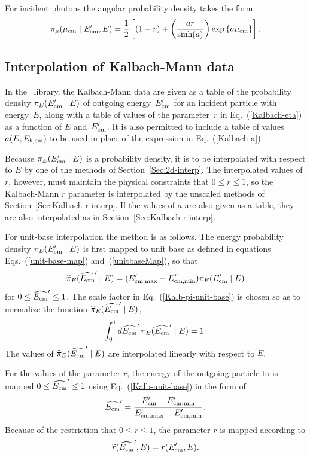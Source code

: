 {For incident photons the angular probability density takes the form
$$
  \pi_\mu( \mu_{\text{cm}} \mid E_{\text{cm}}', E ) =
  \frac{1}{2} \left[
    (1 - r) + \left(
      \frac{ar}{\sinh(a)}
    \right) \exp\left\{a \mu_{\text{cm}}\right\}
  \right].
$$


\subsection{Interpolation of Kalbach-Mann data}\label{Sec:Kalbach-Mann-interp}

In the \xendl\ library, the Kalbach-Mann data are given
as a table of the probability density $\pi_E( E_{\text{cm}}' \mid E)$ of outgoing
energy~$E_{\text{cm}}'$ for an incident particle with energy~$E$,
along with a table of values of the parameter~$r$ in Eq.~(\ref{Kalbach-eta})
as a function of $E$ and~$E_{\text{cm}}'$.  It is also permitted to include a
table of values $a(E,  E_{b,\text{cm}})$ to be used in place of the expression
in Eq.~(\ref{Kalbach-a}).
}%

Because $\pi_E( E_{\text{cm}}' \mid E)$ is a probability
density, it is to be interpolated with respect to $E$ by one of the methods
of Section~\ref{Sec:2d-interp}.  
The interpolated values of $r$, however, must 
maintain the physical constraints that $0 \le r \le 1$,
so the Kalbach-Mann $r$ parameter is interpolated by the unscaled methods of
Section~\ref{Sec:Kalbach-r-interp}.  If the values of $a$ are also
given as a table, they are also interpolated as in Section~\ref{Sec:Kalbach-r-interp}.

For unit-base interpolation the method is as follows.
The energy probability density
$\pi_E( E_{\text{cm}}' \mid E)$ is first mapped to unit base as defined in equations
Eqs.~(\ref{unit-base-map}) and~(\ref{unitbaseMap}), so that
\begin{equation}
  \widehat \pi_E( \widehat {E_{\text{cm}}}' \mid E) =
    ( E'_{\text{cm}, \text{max}} - E'_{\text{cm}, \text{min}} ) 
     \pi_E( E_{\text{cm}}' \mid E)
 \label{Kalb-pi-unit-base}
\end{equation}
for $0 \le \widehat {E_{\text{cm}}}' \le 1$.
The scale factor in Eq.~(\ref{Kalb-pi-unit-base}) is chosen so as to 
normalize the function $\widehat \pi_E( \widehat {E_{\text{cm}}}' \mid E) $,
$$
  \int_0^1 d\widehat {E_{\text{cm}}}' \, \pi_E( \widehat {E_{\text{cm}}}' \mid E) = 1.
$$
The values of $\widehat \pi_E( \widehat {E_{\text{cm}}}' \mid E)$ are
interpolated linearly with respect to $E$.

For the values of the parameter $r$, the energy
of the outgoing particle to is mapped $0 \le \widehat {E_{\text{cm}}}' \le 1$
using Eq.~(\ref{Kalb-unit-base}) in the form of
$$
  \widehat {E_{\text{cm}}}' = \frac{
  E_{\text{cm}}' - E'_{\text{cm}, \text{min}} }
     { E'_{\text{cm}, \text{max}} - E'_{\text{cm}, \text{min}} }.
$$
Because of the
restriction that $0 \le r \le 1$, the parameter $r$ is mapped according to
\begin{equation}
  \widetilde r( \widehat {E_{\text{cm}}}', E ) = r( E_{\text{cm}}', E ).
  \label{map-Kalb-r}
\end{equation}

